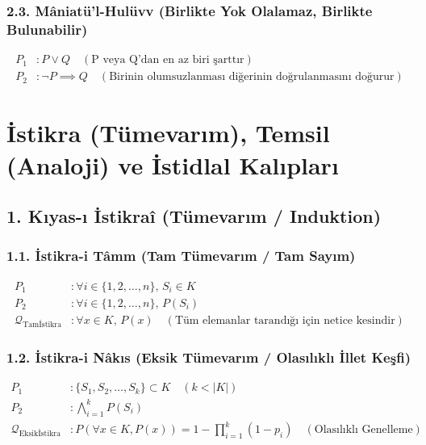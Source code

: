 \documentclass[11pt, a4paper]{article}
\begin{document}
\subsubsection{2.3. Mâniatü'l-Hulüvv (Birlikte Yok Olalamaz, Birlikte Bulunabilir)}
\begin{align}
P_1 &: P \lor Q \quad (\text{P veya Q'dan en az biri şarttır}) \\
P_2 &: \neg P \implies Q \quad (\text{Birinin olumsuzlanması diğerinin doğrulanmasını doğurur})
\end{align}

\section{İstikra (Tümevarım), Temsil (Analoji) ve İstidlal Kalıpları}

\subsection{1. Kıyas-ı İstikraî (Tümevarım / Induktion)}

\subsubsection{1.1. İstikra-i Tâmm (Tam Tümevarım / Tam Sayım)}
\begin{align}
P_1 &: \forall i \in \{1, 2, \dots, n\}, \, S_i \in K \\
P_2 &: \forall i \in \{1, 2, \dots, n\}, \, P(S_i) \\
\mathcal{Q}_{\text{Tamİstikra}} &: \forall x \in K, \, P(x) \quad (\text{Tüm elemanlar tarandığı için netice kesindir})
\end{align}

\subsubsection{1.2. İstikra-i Nâkıs (Eksik Tümevarım / Olasılıklı İllet Keşfi)}
\begin{align}
P_1 &: \{S_1, S_2, \dots, S_k\} \subset K \quad (k < |K|) \\
P_2 &: \bigwedge_{i=1}^k P(S_i) \\
\mathcal{Q}_{\text{Eksikİstikra}} &: P\left( \forall x \in K, P(x) \right) = 1 - \prod_{i=1}^k (1 - p_i) \quad (\text{Olasılıklı Genelleme})
\end{align}
\end{document}
